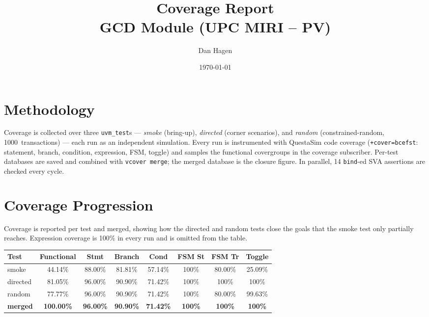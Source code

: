 \documentclass[11pt,a4paper]{article}
\title{Coverage Report \\ \large GCD Module (UPC MIRI -- PV)}
\author{Dan Hagen}
\date{\today}
\begin{document}
\maketitle

\section{Methodology}

Coverage is collected over three \texttt{uvm\_test}s --- \emph{smoke} (bring-up),
\emph{directed} (corner scenarios), and \emph{random} (constrained-random,
1000~transactions) --- each run as an independent simulation. Every run is
instrumented with QuestaSim code coverage (\texttt{+cover=bcefst}: statement,
branch, condition, expression, FSM, toggle) and samples the functional
covergroups in the coverage subscriber. Per-test databases are saved and combined
with \texttt{vcover merge}; the merged database is the closure figure. In parallel,
14 \texttt{bind}-ed SVA assertions are checked every cycle.

\section{Coverage Progression}

Coverage is reported per test and merged, showing how the directed and random
tests close the goals that the smoke test only partially reaches. Expression
coverage is 100\% in every run and is omitted from the table.

\begin{table}[H]
\centering
\footnotesize
\begin{tabular}{lccccccc}
\toprule
\textbf{Test} & \textbf{Functional} & \textbf{Stmt} & \textbf{Branch} & \textbf{Cond} & \textbf{FSM St} & \textbf{FSM Tr} & \textbf{Toggle} \\
\midrule
smoke              & 44.14\% & 88.00\% & 81.81\% & 57.14\% & 100\% & 80.00\%  & 25.09\% \\
directed           & 81.05\% & 96.00\% & 90.90\% & 71.42\% & 100\% & 100\%    & 100\%   \\
random             & 77.77\% & 96.00\% & 90.90\% & 71.42\% & 100\% & 80.00\%  & 99.63\% \\
\midrule
\textbf{merged}    & \textbf{100.00\%} & \textbf{96.00\%} & \textbf{90.90\%} & \textbf{71.42\%} & \textbf{100\%} & \textbf{100\%} & \textbf{100\%} \\
\bottomrule
\end{tabular}
\end{table}
\end{document}
